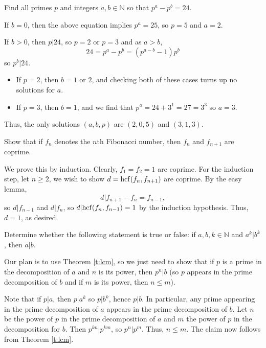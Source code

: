 \documentclass[11pt,dvipsnames]{book}
\def\N{{\mathbb{N}}}
\def\hcf{{\rm hcf}}
\numberwithin{equation}{section} %
\numberwithin{figure}{section} %
\numberwithin{table}{section} %
\begin{document}
\begin{exercise} Find all primes $p$ and integers $a,b\in\N$ so that $p^{a}-p^{b}=24$.


\begin{solution}
 If $b=0$, then the above equation implies $p^{a}=25$, so $p=5$ and $a=2$. 
 
 If $b> 0$, then $p|24$, so $p=2$ or $p=3$ and as $a>b$,
 \[
 24 = p^{a}-p^{b} = (p^{a-b}-1)p^{b}
 \]
 so $p^{b}|24$.
 \begin{itemize}[(a)]
 \item If $p=2$, then $b=1$ or $2$, and checking both of these cases turns up no solutions for $a$.
 \item If $p=3$, then $b=1$, and we find that $p^{a} = 24+3^{1}=27=3^3$ so $a=3$. 
 \end{itemize}
 
 Thus, the only solutions $(a,b,p)$ are $(2,0,5)$ and $(3,1,3)$.
 
 \end{solution}

 
 
 
 



\end{exercise}


\begin{exercise} Show that if $f_{n}$ denotes the $n$th Fibonacci number, then $f_{n}$ and $f_{n+1}$ are coprime. 



\begin{solution}
We prove this by induction. Clearly, $f_{1}=f_{2}=1$ are coprime. For the induction step, let $n\geq 2$, we wish to show $d=\hcf(f_{n},f_{n+1})$ are coprime. By the easy lemma,
\[
d|f_{n+1}-f_{n} = f_{n-1},
\]
so $d|f_{n-1}$ and $d|f_{n}$, so $d|\hcf(f_{n},f_{n-1})=1$ by the induction hypothesis. Thus, $d=1$, as desired. 
\end{solution}

\end{exercise}


\begin{exercise} Determine whether the following statement is true or false: if $a,b,k\in\mathbb{N}$ and $a^k|b^k$, then $a|b$. 

\begin{solution}
Our plan is to use Theorem \ref{t:lcm}, so we just need to show that if $p$ is a prime in the decomposition of $a$ and $n$ is its power, then $p^n|b$ (so $p$ appears in the prime decomposition of $b$ and if $m$ is its power, then $n\leq m$).

Note that if $p|a$, then $p|a^k$ so $p|b^k$, hence $p|b$. In particular, any prime appearing in the prime decomposition of $a$ appears in the prime decomposition of $b$. Let $n$ be the power of $p$ in the prime decomposition of $a$ and $m$ the power of $p$ in the decomposition for $b$. Then $p^{kn}|p^{km}$, so $p^n|p^m$. Thus, $n\leq m$. The claim now follows from Theorem \ref{t:lcm}. 
\end{solution}


\end{exercise}
\end{document}
